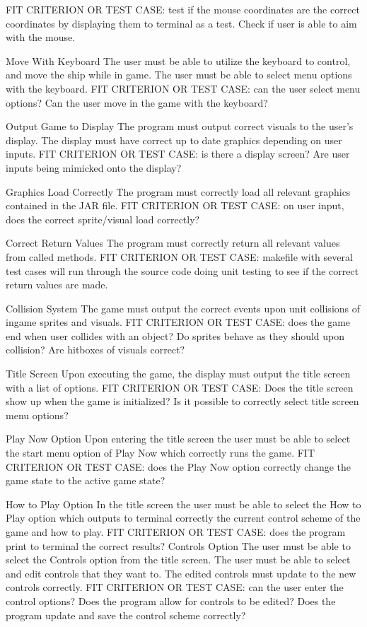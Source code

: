 \documentclass[12pt, titlepage]{article}
\begin{document}
FIT CRITERION OR TEST CASE: test if the mouse coordinates are the correct coordinates by displaying them to terminal as a test. Check if user is able to aim with the mouse.


Move With Keyboard
The user must be able to utilize the keyboard to control, and move the ship while in game. The user must be able to select menu options with the keyboard.
FIT CRITERION OR TEST CASE: can the user select menu options? Can the user move in the game with the keyboard?


Output Game to Display
The program must output correct visuals to the user’s display. The display must have correct up to date graphics depending on user inputs.
FIT CRITERION OR TEST CASE: is there a display screen? Are user inputs being mimicked onto the display?


Graphics Load Correctly
The program must correctly load all relevant graphics contained in the JAR file.
FIT CRITERION OR TEST CASE: on user input, does the correct sprite/visual load correctly?


Correct Return Values
The program must correctly return all relevant values from called methods.
FIT CRITERION OR TEST CASE: makefile with several test cases will run through the source code doing unit testing to see if the correct return values are made.


Collision System
The game must output the correct events upon unit collisions of ingame sprites and visuals.
FIT CRITERION OR TEST CASE: does the game end when user collides with an object? Do sprites behave as they should upon collision? Are hitboxes of visuals correct?


Title Screen 
Upon executing the game, the display must output the title screen with a list of options.
FIT CRITERION OR TEST CASE: Does the title screen show up when the game is initialized? Is it possible to correctly select title screen menu options?


Play Now Option
Upon entering the title screen the user must be able to select the start menu option of Play Now which correctly runs the game.
FIT CRITERION OR TEST CASE: does the Play Now option correctly change the game state to the active game state?


How to Play Option
In the title screen the user must be able to select the How to Play option which outputs to terminal correctly the current control scheme of the game and how to play.
FIT CRITERION OR TEST CASE: does the program print to terminal the correct results?
Controls Option
The user must be able to select the Controls option from the title screen. The user must be able to select and edit controls that they want to. The edited controls must update to the new controls correctly.
FIT CRITERION OR TEST CASE:  can the user enter the control options? Does the program allow for controls to be edited? Does the program update and save the control scheme correctly?
\end{document}
